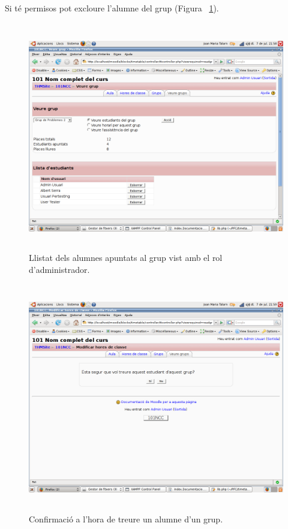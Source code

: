 \documentclass[a4paper]{report}  %
\begin{document}
\begin{itemize}
Si té permisos pot excloure l'alumne del grup (Figura ~\ref{fig:VeureGrupEstudiantsTotsalli}).
		\begin{figure}[H] %
		\begin{center}
		\includegraphics[height=10cm,width=12cm]{img/VeureGrupEstudiantsTotsalli.png}
		\caption[List caption]{Llistat dels alumnes apuntats al grup vist amb el rol d'administrador.}
		\label{fig:VeureGrupEstudiantsTotsalli}
		\end{center}
		\end{figure}

		\begin{figure}[H] %
		\begin{center}
		\includegraphics[height=10cm,width=12cm]{img/VeureGrupEsborrantUsuari.png}
		\caption[List caption]{Confirmació a l'hora de treure un alumne d'un grup.}
		\label{fig:VeureGrupEsborrantUsuari}
		\end{center}
		\end{figure}
		

\end{itemize}
\end{document}

